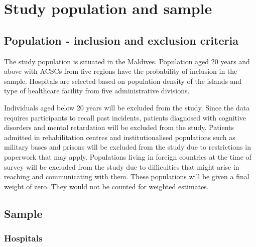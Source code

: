 
\section{Study population and sample}

\subsection{Population - inclusion and exclusion criteria}

The study population is situated in the Maldives. Population aged 20 years and above with ACSCs from five regions have the probability of inclusion in the sample. Hospitals are selected based on population density of the islands and type of healthcare facility from five administrative divisions.

Individuals aged below 20 years will be excluded from the study. Since the data requires participants to recall past incidents, patients diagnosed with cognitive disorders and mental retardation will be excluded from the study. Patients admitted in rehabilitation centres and institutionalised populations such as military bases and prisons will be excluded from the study due to restrictions in paperwork that may apply. Populations living in foreign countries at the time of survey will be excluded from the study due to difficulties that might arise in reaching and communicating with them. These populations will be given a final weight of zero. They would not be counted for weighted estimates.

\subsection{Sample}

\subsubsection{Hospitals}

